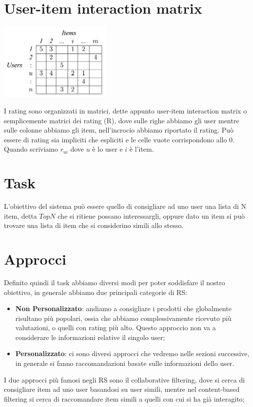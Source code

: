 \section{User-item interaction matrix}
\begin{minipage}[H]{0.40\textwidth}
	\includegraphics[width=5.5cm]{figures/Sample-of-user-item-matrix}
\end{minipage}
\begin{minipage}[H]{0.55\textwidth}
	I rating sono organizzati in matrici, dette appunto user-item interaction matrix o semplicemente matrici dei rating (R), dove sulle righe abbiamo gli user mentre sulle colonne abbiamo gli item, nell'incrocio abbiamo riportato il rating. 
	Può essere di rating sia impliciti che espliciti e le celle vuote corrispondono allo 0.
	Quando scriviamo $r_{ui}$ dove $u$ è lo user e $i$ è l'item.
\end{minipage}

\section{Task}
L'obiettivo del sistema può essere quello di consigliare ad uno user una lista di N item, detta \textbf{$TopN$} che si ritiene possano interessargli, oppure dato un item si può trovare una lista di item che si considerino simili allo stesso.

\section{Approcci}
Definito quindi il task abbiamo diversi modi per poter soddisfare il nostro obiettivo, in generale abbiamo due principali categorie di RS:
\begin{itemize}
	\item \textbf{Non Personalizzato}: andiamo a consigliare i prodotti che globalmente risultano più popolari, ossia che abbiamo complessivamente ricevuto più valutazioni, o quelli con rating più alto. Questo approccio non va a considerare le informazioni relative il singolo user;
	\item \textbf{Personalizzato}: ci sono diversi approcci che vedremo nelle sezioni successive, in generale si fanno raccomandazioni basate sulle informazioni dello user.
\end{itemize}
I due approcci più famosi negli RS sono il collaborative filtering, dove si cerca di consigliare item ad uno user basandosi su user simili, mentre nel content-based filtering si cerca di raccomandare item simili a quelli con cui si ha già interagito;


